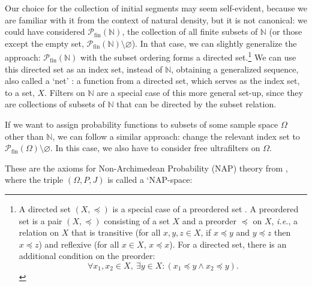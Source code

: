 Our choice for the collection of initial segments may seem self-evident, because we are familiar with it from the context of natural density, but it is not canonical: we could have considered $\mathcal{P}_{\textrm{fin}}(\mathbb{N})$, the collection of all finite subsets of $\mathbb{N}$ (or those except the empty set, $\mathcal{P}_{\textrm{fin}}(\mathbb{N}) \setminus \varnothing$). In that case, we can slightly generalize the approach: $\mathcal{P}_{\textrm{fin}}(\mathbb{N})$ with the subset ordering forms a directed set.\footnote{A directed set $(X, \preccurlyeq)$ is a special case of a preordered set \citep[see, \textit{e.g.},][p.~52]{Schechter:1997}. A preordered set is a pair $(X, \preccurlyeq)$ consisting of a set $X$ and a preorder $\preccurlyeq$ on $X$, \textit{i.e.}, a relation on $X$ that is transitive (for all $x,y,z \in X$, if $x \preccurlyeq y$ and $y \preccurlyeq z$ then $x \preccurlyeq z$) and reflexive (for all $x \in X$, $x \preccurlyeq x$). For a directed set, there is an additional condition on the preorder:
$$\forall x_1, x_2 \in X, \ \exists y \in X: (x_1 \preccurlyeq y \wedge x_2 \preccurlyeq y).$$} We can use this directed set as an index set, instead of $\mathbb{N}$, obtaining a generalized sequence, also called a `net' \citep[see, \textit{e.g.},][pp.~157--158]{Schechter:1997}: a function from a directed set, which serves as the index set, to a set, $X$. Filters on $\mathbb{N}$ are a special case of this more general set-up, since they are collections of subsets of $\mathbb{N}$ that can be directed by the subset relation.

If we want to assign probability functions to subsets of some sample space $\Omega$ other than $\mathbb{N}$, we can follow a similar approach: change the relevant index set to $\mathcal{P}_{\textrm{fin}}(\Omega) \setminus \varnothing$.
In this case, we also have to consider free ultrafilters on $\Omega$.

These are the axioms for Non-Archimedean Probability (NAP) theory from \citet{Benci_etal:2013}, where the triple $(\Omega ,P,J)$ is called a `NAP-space:

